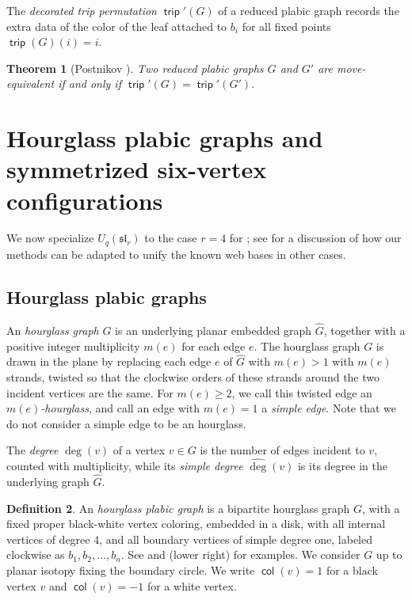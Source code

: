 \documentclass{amsart}
\newtheorem{theorem}{Theorem}[section]
\theoremstyle{definition}
\newtheorem{definition}[theorem]{Definition}
\theoremstyle{remark}
\numberwithin{equation}{section}
\DeclareMathOperator{\trip}{\mathsf{trip}}
\DeclareMathOperator{\col}{\mathsf{col}}
\newcommand{\fsl}{\mathfrak{sl}}
\newcommand{\symm}{symmetrized }
\begin{document}
The \emph{decorated trip permutation} ${\trip'}(G)$ of a reduced plabic graph records the extra data of the color of the leaf attached to $b_i$ for all fixed points $\trip(G)(i)=i$.

\begin{theorem}[Postnikov \cite{Postnikov-arxiv}]
\label{thm:plabic-trip-iff-move}
Two reduced plabic graphs $G$ and $G'$ are move-equivalent if and only if $\trip'(G)=\trip'(G')$.
\end{theorem}

\section{Hourglass plabic graphs and \symm six-vertex configurations} 
\label{sec:hourglass-and-six-vertex}

 We now specialize $U_q(\fsl_r)$ to the case $r=4$ for ; see  for a discussion of how our methods can be adapted to unify the known web bases in other cases.


\subsection{Hourglass plabic graphs}
An \emph{hourglass graph} $G$ is an underlying planar embedded graph $\widehat{G}$, together with a positive integer multiplicity $m(e)$ for each edge $e$. The hourglass graph $G$ is drawn in the plane by replacing each edge $e$ of $\widehat{G}$ with $m(e)>1$ with $m(e)$ strands, twisted so that the clockwise orders of these strands around the two incident vertices are the same. For $m(e) \geq 2$, we call this twisted edge an \emph{$m(e)$-hourglass}, and call an edge with $m(e)=1$ a \emph{simple edge}. Note that we do not consider a simple edge to be an hourglass. 

The \emph{degree} $\deg(v)$ of a vertex $v \in G$ is the number of edges incident to $v$, counted with multiplicity, while its \emph{simple degree} $\widehat{\deg}(v)$ is its degree in the underlying graph $\widehat{G}$.

\begin{definition}
\label{def:hourglass-plabic-graph}
An \emph{hourglass plabic graph} is a bipartite hourglass graph $G$, with a fixed proper black-white vertex coloring, embedded in a disk, with all internal vertices of degree 4, and all boundary vertices of simple degree one, labeled clockwise as $b_1,b_2,\ldots, b_n$. See  and  (lower right) for examples. We consider $G$ up to planar isotopy fixing the boundary circle. We write $\col(v)=1$ for a black vertex $v$ and $\col(v)=-1$ for a white vertex.
\end{definition}
\end{document}
